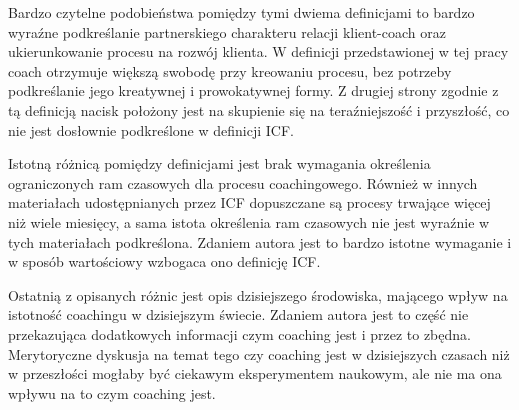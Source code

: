Bardzo czytelne podobieństwa pomiędzy tymi dwiema definicjami to bardzo wyraźne podkreślanie partnerskiego charakteru relacji klient-coach
oraz ukierunkowanie procesu na rozwój klienta. W definicji przedstawionej w tej pracy coach otrzymuje większą swobodę przy kreowaniu procesu, bez
potrzeby podkreślanie jego kreatywnej i prowokatywnej formy. Z drugiej strony zgodnie z tą definicją nacisk położony jest na skupienie się na
teraźniejszość i przyszłość, co nie jest dosłownie podkreślone w definicji ICF.

Istotną różnicą pomiędzy definicjami jest brak wymagania określenia ograniczonych ram czasowych dla procesu coachingowego. Również w innych materiałach
udostępnianych przez ICF dopuszczane są procesy trwające więcej niż wiele miesięcy, a sama istota określenia ram czasowych nie jest wyraźnie w tych materiałach
podkreślona. Zdaniem autora jest to bardzo istotne wymaganie i w sposób wartościowy wzbogaca ono definicję ICF.

Ostatnią z opisanych różnic jest opis dzisiejszego środowiska, mającego wpływ na istotność coachingu w dzisiejszym świecie. Zdaniem autora jest to część
nie przekazująca dodatkowych informacji czym coaching jest i przez to zbędna. Merytoryczne dyskusja na temat tego czy coaching jest w dzisiejszych czasach
niż w przeszłości mogłaby być ciekawym eksperymentem naukowym, ale nie ma ona wpływu na to czym coaching jest.
